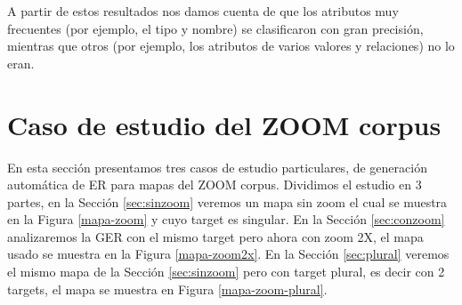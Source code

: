 
A partir de estos resultados nos damos cuenta de que los atributos muy frecuentes (por ejemplo, el tipo y nombre) se clasificaron con gran precisi\'on, mientras que otros (por ejemplo, los atributos de varios valores y relaciones) no lo eran.







\section{Caso de estudio del ZOOM corpus}
\label{sec:caso_estudio}

En esta secci\'on presentamos tres casos de estudio particulares, de generaci\'on autom\'atica de ER para mapas del ZOOM corpus. Dividimos el estudio en 3 partes, en la Secci\'on \ref{sec:sinzoom} veremos un mapa sin zoom el cual se muestra en la Figura \ref{mapa-zoom} y cuyo target es singular. En la Secci\'on \ref{sec:conzoom} analizaremos la GER con el mismo target pero ahora con zoom 2X, el mapa usado se muestra en la Figura \ref{mapa-zoom2x}. En la Secci\'on \ref{sec:plural} veremos el mismo mapa de la Secci\'on \ref{sec:sinzoom} pero con target plural, es decir con 2 targets, el mapa se muestra en Figura \ref{mapa-zoom-plural}.


%



